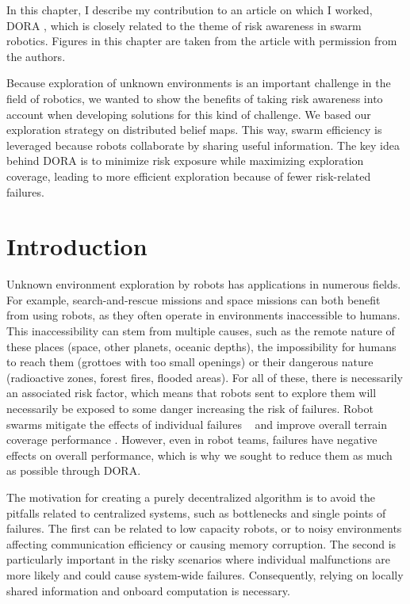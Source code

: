 \label{sec:Theme2}

In this chapter, I describe my contribution to an article on which I worked, \ac{DORA} \cite{vielfaure2021dora}, which is closely related to the theme of risk awareness in swarm robotics. Figures in this chapter are taken from the article with permission from the authors.

Because exploration of unknown environments is an important challenge in the
field of robotics, we wanted to show the benefits of taking risk awareness into account when developing solutions for this kind of challenge. We based our exploration strategy on distributed belief maps. This way, swarm efficiency is leveraged because robots collaborate by sharing useful information. The key idea behind \ac{DORA} is to minimize risk exposure while maximizing exploration coverage, leading to more efficient exploration because of fewer risk-related failures. 


\section{Introduction}
Unknown environment exploration by robots has applications in numerous fields. For example, search-and-rescue missions \cite{matos2016multiple} and space missions \cite{fong2005interaction} can both benefit from using robots, as they often operate in environments inaccessible to humans. This inaccessibility can stem from multiple causes, such as the remote nature of these places (space, other planets, oceanic depths), the impossibility for humans to reach them (grottoes with too small openings) or their dangerous nature (radioactive zones, forest fires, flooded areas). For all of these, there is necessarily an associated risk factor, which means that robots sent to explore them will necessarily be exposed to some danger increasing the risk of failures. Robot swarms mitigate the effects of individual failures ~\cite{ramachandran2019resilience,wehbe2021probabilistic,winfield2006safety} and improve overall terrain coverage performance \cite{burgard2005coordinated}. However, even in robot teams, failures have negative effects on overall performance, which is why we sought to reduce them as much as possible through \ac{DORA}.

The motivation for creating a purely decentralized algorithm is to avoid the pitfalls related to centralized systems, such as bottlenecks and single points of failures. The first can be related to low capacity robots, or to noisy environments affecting communication efficiency or causing memory corruption. The second is particularly important in the risky scenarios where individual malfunctions are more likely and could cause system-wide failures. Consequently, relying on locally shared information and onboard computation is necessary.

